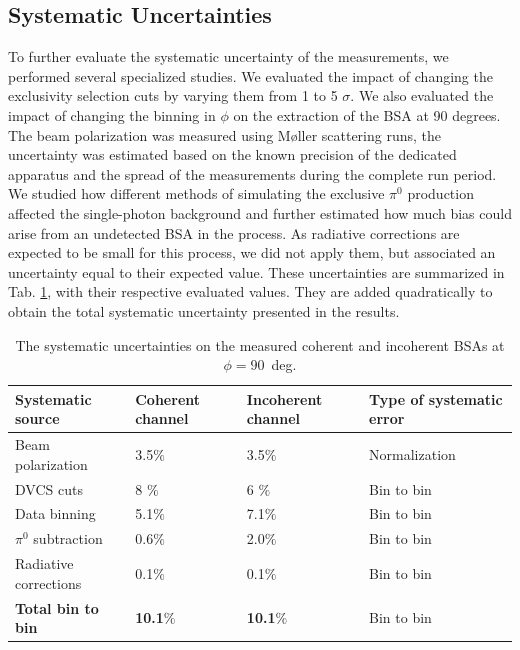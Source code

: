 \documentclass[aps,prc,preprint,superscriptaddress]{revtex4}
\begin{document}
\subsection{Systematic Uncertainties}

To further evaluate the systematic uncertainty of the measurements, we performed several specialized studies. We 
evaluated the impact of changing the exclusivity selection cuts by varying them from 1 to 5 $\sigma$. 
We also evaluated the impact of changing the binning in $\phi$ on the extraction of the BSA
at 90 degrees. The beam polarization was measured using M\o{}ller scattering runs, the uncertainty was 
estimated based on the known precision of the dedicated apparatus and the spread 
of the measurements during the complete run period. We studied how different methods of
simulating the exclusive $\pi^0$ production affected the single-photon background and
further estimated how much bias could arise from an undetected BSA in the process. As 
radiative corrections are expected to be small
for this process, we did not apply them, but associated an uncertainty equal to their expected value.
These uncertainties are summarized in Tab. \ref{Table:systematic_uncertainties}, with their respective 
evaluated values. They are added quadratically to obtain the total systematic uncertainty presented in the results.

\begin{table}[tbp]
\begin{center}
	\begin{tabular}{|m{4cm}|m{2cm}<{\centering}|m{2.3cm}<{\centering}|m{3.7cm}<{\centering}|}
\hline
\bf Systematic source & \bf  Coherent channel  & \bf Incoherent channel & \bf Type of systematic 
error\\
\hline
Beam polarization &  3.5$\%$ &  3.5$\%$& Normalization\\
\hline
\hline
DVCS cuts & 8 $\%$ &  6 $\%$ & Bin to bin\\
\hline
Data binning & 5.1$\%$ & 7.1$\%$ & Bin to bin\\
\hline
$\pi^0$ subtraction &  0.6$\%$ &  2.0$\%$ & Bin to bin\\
\hline
Radiative corrections &  0.1$\%$ & 0.1$\%$ & Bin to bin\\
\hline
\hline
\textbf{Total bin to bin} &  \textbf{10.1}$\%$ &   \textbf{10.1}$\%$ & Bin to 
bin\\
\hline
\end{tabular}
\caption{The systematic uncertainties on the measured coherent and incoherent 
BSAs at $\phi = 90$~deg.}
\label{Table:systematic_uncertainties}
\end{center}
\end{table}
\end{document}
